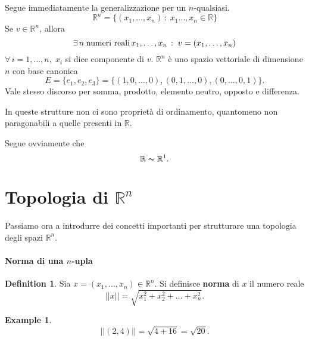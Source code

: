 \documentclass{article}
\theoremstyle{plain}
\theoremstyle{definition}
\newtheorem{defn}{Definition}[section]
\newtheorem{exmp}{Example}[section]
\theoremstyle{remark}
\begin{document}
\vspace{10pt}

Segue immediatamente la generalizzazione per un $n$-qualsiasi. 
\[\mathbb{R}^n=\{(x_1,\ldots,x_n)\,:\;x_1\ldots,x_n\in\mathbb{R}\}\]
Se $v\in\mathbb{R}^n$, allora 
\[\exists\, n\;\textup{numeri reali}\,x_1,\ldots,x_n\,:\; v=(x_1,\ldots,x_n)\]
$\forall\,i=1,\ldots,n,\;x_i$ si dice componente di $v$.
$\mathbb{R}^n$ è uno spazio vettoriale di dimensione $n$ con base canonica \[E=\{e_1,e_2,e_3\}=\{(1,0,\ldots,0),(0,1,\ldots,0),(0,\ldots,0,1)\}.\]
Vale stesso discorso per somma, prodotto, elemento neutro, opposto e differenza.

\vspace{10pt}

In queste strutture non ci sono proprietà di ordinamento, quantomeno non paragonabili a quelle presenti in $\mathbb{R}$. 

\vspace{10pt}

Segue ovviamente che 
\[\mathbb{R}\thicksim \mathbb{R}^1.\]

\vspace{10pt}

\section{Topologia di $\mathbb{R}^n$}

\vspace{10pt}

Passiamo ora a introdurre dei concetti importanti per strutturare una topologia degli spazi $\mathbb{R}^n$.

\vspace{10pt}

\paragraph{Norma di una $n$-upla}
\begin{bxthm}
\begin{defn}
    Sia $x=(x_1,\ldots,x_n)\in\mathbb{R}^n$. Si definisce \textbf{norma} di $x$ il numero reale 
    \[||x||=\sqrt{x_1^2+x_2^2+\ldots+x_n^2}.\]
\end{defn}
\end{bxthm}

\vspace{10pt}

\begin{exmp}
    \[||(2,4)||=\sqrt{4+16}=\sqrt{20}.\]
\end{exmp}
\end{document}
